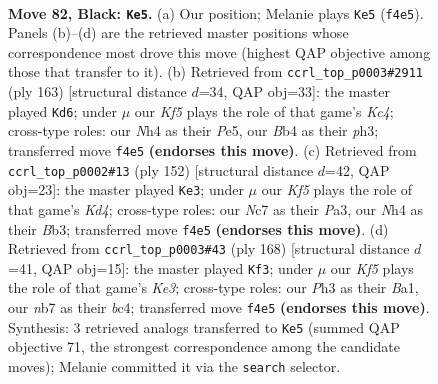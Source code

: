 \documentclass[11pt]{article}
\begin{document}
\clearpage

\begin{figure}[p]\centering
\begin{subfigure}{0.46\textwidth}\centering
\resizebox{\linewidth}{!}{%
\newchessgame
\chessboard[
  setfen={8/1Nn5/8/p7/Pb1pPk1n/1P1B3p/4P3/3K4 b - - 31 82},
  showmover=false,
  pgfstyle=straightmove, color=movearrow, markmove={f4-e5}
]}
\caption{}
\end{subfigure}\hfill
\begin{subfigure}{0.46\textwidth}\centering
\resizebox{\linewidth}{!}{%
\newchessgame
\chessboard[
  setfen={8/8/8/p1kPp1p1/7p/1B2PP1P/P3K3/2b5 b - - 81 82},
  showmover=false,
  pgfstyle=straightmove, color=movearrow, markmove={c5-d6}
]}
\caption{}
\end{subfigure}
\\[4pt]
\begin{subfigure}{0.46\textwidth}\centering
\resizebox{\linewidth}{!}{%
\newchessgame
\chessboard[
  setfen={4b3/4k3/p6p/1p3p2/1P1KpP1P/PB6/8/8 w - - 16 77},
  showmover=false,
  pgfstyle=straightmove, color=movearrow, markmove={d4-e3}
]}
\caption{}
\end{subfigure}\hfill
\begin{subfigure}{0.46\textwidth}\centering
\resizebox{\linewidth}{!}{%
\newchessgame
\chessboard[
  setfen={6k1/1B3p2/Pb4p1/2p1P2p/2b4P/4K1P1/8/B7 w - - 45 85},
  showmover=false,
  pgfstyle=straightmove, color=movearrow, markmove={e3-f3}
]}
\caption{}
\end{subfigure}
\caption{\textbf{Move 82, Black: \texttt{Ke5}.} (a) Our position; Melanie plays \texttt{Ke5} (\texttt{f4e5}). Panels (b)--(d) are the retrieved master positions whose correspondence most drove this move (highest QAP objective among those that transfer to it). (b) Retrieved from \texttt{ccrl\_top\_p0003\#2911} (ply 163) [structural distance $d$=34, QAP obj=33]: the master played \texttt{Kd6}; under $\mu$ our \emph{Kf5} plays the role of that game's \emph{Kc4}; cross-type roles: our \emph{N}h4 as their \emph{P}e5, our \emph{B}b4 as their \emph{p}h3; transferred move \texttt{f4e5} \textbf{(endorses this move)}. (c) Retrieved from \texttt{ccrl\_top\_p0002\#13} (ply 152) [structural distance $d$=42, QAP obj=23]: the master played \texttt{Ke3}; under $\mu$ our \emph{Kf5} plays the role of that game's \emph{Kd4}; cross-type roles: our \emph{N}c7 as their \emph{P}a3, our \emph{N}h4 as their \emph{B}b3; transferred move \texttt{f4e5} \textbf{(endorses this move)}. (d) Retrieved from \texttt{ccrl\_top\_p0003\#43} (ply 168) [structural distance $d$=41, QAP obj=15]: the master played \texttt{Kf3}; under $\mu$ our \emph{Kf5} plays the role of that game's \emph{Ke3}; cross-type roles: our \emph{P}h3 as their \emph{B}a1, our \emph{n}b7 as their \emph{b}c4; transferred move \texttt{f4e5} \textbf{(endorses this move)}. Synthesis: 3 retrieved analogs transferred to \texttt{Ke5} (summed QAP objective 71, the strongest correspondence among the candidate moves); Melanie committed it via the \texttt{search} selector.}
\label{fig:thought-m163}
\end{figure}
\end{document}
